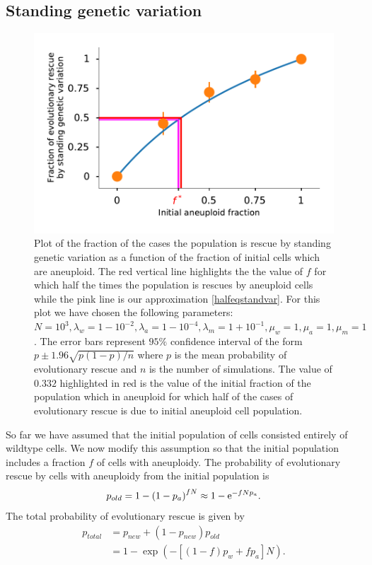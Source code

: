 \documentclass[12pt]{extarticle}
\newcommand{\e}{{\rm e}}
\begin{document}
\subsection*{Standing genetic variation}
\begin{figure}[!t]
 \vspace*{1\baselineskip}
\includegraphics[width=1\textwidth]{Figures/FractionPlot.pdf}
\caption{Plot of the fraction of the cases the population is rescue by standing genetic variation as a function of the fraction of initial cells which are aneuploid. The red vertical line highlights the the value of $f$ for which half the times the population is rescues by aneuploid cells while the pink line is our approximation \eqref{halfeqstandvar}. For this plot we have chosen the following parameters: $N=10^3, \lambda_w=1-10^{-2}, \lambda_a=1-10^{-4},\lambda_m=1+10^{-1},\mu_w=1,\mu_a=1,\mu_m=1$. The error bars represent $95\%$ confidence interval of the form $p\pm1.96\sqrt{p\left(1-p\right)/n}$ where $p$ is the mean probability of evolutionary rescue and $n$ is the number of simulations. The value of $0.332$ highlighted in red is the value of the initial fraction of the population which in aneuploid for which half of the cases of evolutionary rescue is due to initial aneuploid cell population.}
\label{FractionPlot}
\end{figure}
So far we have assumed that the initial population of cells consisted entirely of wildtype cells.
We now modify this assumption so that the initial population includes a fraction $f$ of cells with aneuploidy.
The probability of evolutionary rescue by cells with aneuploidy from the initial population is
\begin{equation*}
p_{old} = 1-\left(1-p_a\right)^{fN}\approx 1-\e^{-fNp_a}.
\end{equation*}
The total probability of evolutionary rescue is given by
\begin{align}\nonumber
p_{total} 	&= p_{new}+\left(1-p_{new}\right)p_{old}\\
			&= 1-\exp\left(-\left[\left(1-f\right)p_w + fp_a\right]N\right) .
\end{align}
\end{document}
